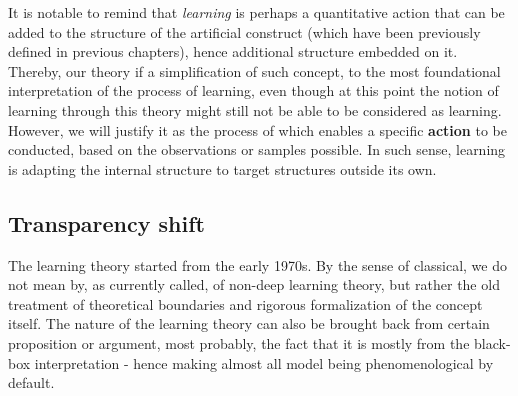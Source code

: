 It is notable to remind that \textit{learning} is perhaps a quantitative action that can be added to the structure of the artificial construct (which have been previously defined in previous chapters), hence additional structure embedded on it. Thereby, our theory if a simplification of such concept, to the most foundational interpretation of the process of learning, even though at this point the notion of learning through this theory might still not be able to be considered as learning. However, we will justify it as the process of which enables a specific \textbf{action} to be conducted, based on the observations or samples possible. In such sense, learning is adapting the internal structure to target structures outside its own. 

\subsection{Transparency shift}

The learning theory started from the early 1970s. By the sense of classical, we do not mean by, as currently called, of non-deep learning theory, but rather the old treatment of theoretical boundaries and rigorous formalization of the concept itself. The nature of the learning theory can also be brought back from certain proposition or argument, most probably, the fact that it is mostly from the black-box interpretation - hence making almost all model being phenomenological by default. 

